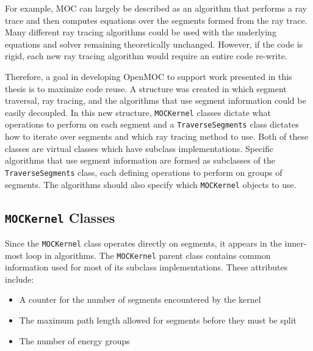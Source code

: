 For example, \ac{MOC} can largely be described as an algorithm that performs a ray trace and then computes equations over the segments formed from the ray trace. Many different ray tracing algorithms could be used with the underlying equations and solver remaining theoretically unchanged. However, if the code is rigid, each new ray tracing algorithm would require an entire code re-write.

Therefore, a goal in developing OpenMOC to support work presented in this thesis is to maximize code reuse. A structure was created in which segment traversal, ray tracing, and the algorithms that use segment information could be easily decoupled. In this new structure, \texttt{MOCKernel} classes dictate what operations to perform on each segment and a \texttt{TraverseSegments} class dictates how to iterate over segments and which ray tracing method to use. Both of these classes are virtual classes which have subclass implementations. Specific algorithms that use segment information are formed as subclasses of the \texttt{TraverseSegments} class, each defining operations to perform on groups of segments. The algorithms should also specify which \texttt{MOCKernel} objects to use.


\subsection{\texttt{MOCKernel} Classes}

Since the \texttt{MOCKernel} class operates directly on segments, it appears in the inner-most loop in algorithms. The \texttt{MOCKernel} parent class contains common information used for most of its subclass implementations. These attributes include:
\begin{itemize}
	\item A counter for the number of segments encountered by the kernel
	\item The maximum path length allowed for segments before they must be split
	\item The number of energy groups
\end{itemize}

